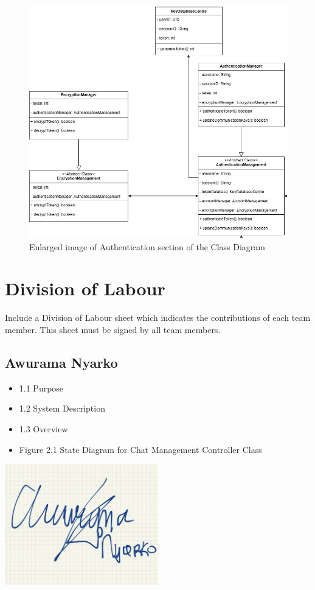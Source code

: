 \documentclass[]{article}
\begin{document}
\begin{figure}[H]
	\centering
	\includegraphics[width=1\textwidth]{authentication-class-diagram.png}
	\caption{Enlarged image of Authentication section of the Class Diagram}
	\label{fig:class-diagram}
\end{figure}

\newpage
\appendix
\section{Division of Labour}
\label{sec:division_of_labour}
Include a Division of Labour sheet which indicates the contributions of each team member. This sheet must be signed by all team members.
\subsection{Awurama Nyarko}
\label{subsec:awurama_nyarko}
\begin{itemize}
	\item 1.1 Purpose
	\item 1.2 System Description
	\item 1.3 Overview
	\item Figure 2.1 State Diagram for Chat Management Controller Class
\end{itemize}
\includegraphics[width=0.5\textwidth]{awurama.jpg}
\end{document}

